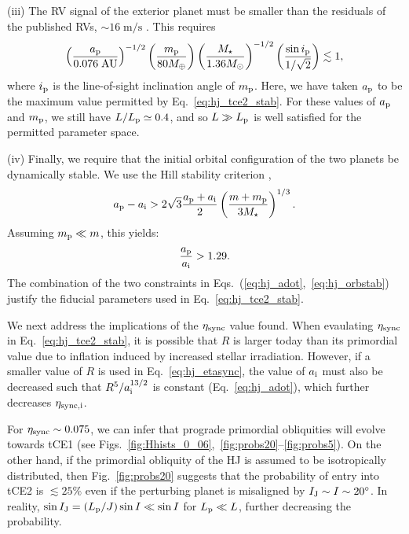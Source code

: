 \documentclass[
        fleqn,
        usenatbib,
        referee
    ]{mnras}
\newcommand*{\p}[1]{\left(#1\right)}
\newcommand*{\s}[1]{\left[#1\right]}
\begin{document}
(iii) The RV signal of the exterior planet must be smaller than the residuals of
the published RVs, $\sim 16\;\mathrm{m/s}$ \citep{hebb2009wasp,
husnoo2011orbital, knutson2014friends, bonomo2017gaps}. This requires
\begin{equation}
    \p{\frac{a_{\rm p}}{0.076\;\mathrm{AU}}}^{-1/2}
    \p{\frac{m_{\rm p}}{80M_{\oplus}}}
    \p{\frac{M_\star}{1.36M_{\odot}}}^{-1/2}
    \p{\frac{\sin i_{\rm p}}{1 / \sqrt{2}}} \lesssim 1,
    \label{eq:hj_rv}
\end{equation}
where $i_{\rm p}$ is the line-of-sight inclination angle of $m_{\rm p}$. Here,
we have taken $a_{\rm p}$ to be the maximum value permitted by
Eq.~\eqref{eq:hj_tce2_stab}. For these values of $a_{\rm p}$ and $m_{\rm p}$, we
still have $L / L_{\rm p} \simeq 0.4$, and so $L \gg L_{\rm p}$ is well satisfied
for the permitted parameter space.

(iv) Finally, we require that the initial orbital configuration of the two
planets be dynamically stable. We use the Hill stability criterion
\citep[e.g.][]{petit2020path},
\begin{equation}
    a_{\rm p} - a_{\rm i} > 2\sqrt{3} \frac{a_{\rm p} + a_{\rm
        i}}{2} \p{\frac{m + m_{\rm p}}{3M_{\star}}}^{1/3}.
\end{equation}
Assuming $m_{\rm p} \ll m$, this yields:
\begin{equation}
    \frac{a_{\rm p}}{a_{\rm i}} > 1.29.\label{eq:hj_orbstab}
\end{equation}
The combination of the two constraints in
Eqs.~(\ref{eq:hj_adot},~\ref{eq:hj_orbstab}) justify the fiducial parameters
used in Eq.~\eqref{eq:hj_tce2_stab}.

We next address the implications of the $\eta_{\rm sync}$ value found. When
evaulating $\eta_{\rm sync}$ in Eq.~\eqref{eq:hj_tce2_stab}, it is possible
that $R$ is larger today than its primordial value due to inflation induced by
increased stellar irradiation. However, if a smaller value of $R$ is used in
Eq.~\eqref{eq:hj_etasync}, the value of $a_{\rm i}$ must also be decreased such
that $R^5 / a_{\rm i}^{13/2}$ is constant (Eq.~\ref{eq:hj_adot}), which further
decreases $\eta_{\rm sync, i}$.

For $\eta_{\rm sync} \sim 0.075$, we can infer that prograde primordial
obliquities will evolve towards tCE1 (see
Figs.~\ref{fig:Hhists_0_06},~\ref{fig:probs20}--\ref{fig:probs5}). On the other
hand, if the primordial obliquity of the HJ is assumed to be isotropically
distributed, then Fig.~\ref{fig:probs20} suggests that the probability of entry
into tCE2 is $\lesssim 25\%$ even if the perturbing planet is misaligned by
$I_{\rm J} \sim I \sim 20^\circ$. In reality, $\sin I_{\rm J} = \p{L_{\rm p} /
J}\sin I \ll \sin I$ for $L_{\rm p} \ll L$, further decreasing the probability.
\end{document}
